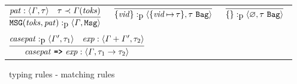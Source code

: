 \documentclass[final]{article}
\begin{document}
\begin{figure}[t]
\begin{small}
\begin{center}
  \begin{tabular}{llllll}
    \multicolumn{2}{l}{
      $\MEMinferc
      {\MEMtypingpat{\CONSmsg{\METAatoms}{\METApat}}{\METAityenv}{\CONSmsgty}}
      {\MEMtyping{\METApat}{\METAityenv}{\METAity}}
      {\MEMinstance{\METAity}{\MEMafunc{\METAityenv}{\METAatoms}}}$
    }

    &

    \multicolumn{2}{l}{
      $\MEMinfera
      {\MEMtypingpat{\CONSbagpatsing{\METAvid}}{\{\asgn{\METAvid}{\METAity}\}}{\CONSconsty{\METAity}{\CONSbagty}}}$

    }



    &

    \multicolumn{2}{l}{
      $\MEMinfera
      {\MEMtypingpat{\CONSbagpatnil}{\CONSemptyityenv}{\CONSconsty{\METAity}{\CONSbagty}}}$
    }

    \\
    &&&
    \\





    \multicolumn{6}{l}{
      $\MEMinferc
      {\MEMtyping{\CONSmrule{\METAcasepat}{\METAexp}}{\METAityenv}{\CONSarrowty{\METAity_1}{\METAity_2}}}
      {\MEMtypingpat{\METAcasepat}{\METAityenv'}{\METAity_1}}
      {\MEMtyping{\METAexp}{\MEMplusenv{\METAityenv}{\METAityenv'}}{\METAity_2}}$
    }
  \end{tabular}
\end{center}
\caption{\eml\ typing rules - matching rules}
\label{fig:typing-rules-mrules}
\end{small}
\end{figure}
\end{document}
